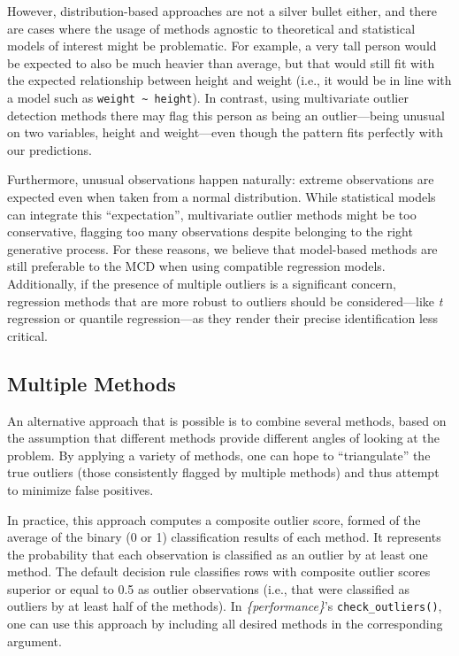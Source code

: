 \documentclass[mathematics,article,submit,moreauthors,pdftex]{mdpi}
\begin{document}
However, distribution-based approaches are not a silver bullet either,
and there are cases where the usage of methods agnostic to theoretical
and statistical models of interest might be problematic. For example, a
very tall person would be expected to also be much heavier than average,
but that would still fit with the expected relationship between height
and weight (i.e., it would be in line with a model such as
\texttt{weight\ \textasciitilde{}\ height}). In contrast, using
multivariate outlier detection methods there may flag this person as
being an outlier---being unusual on two variables, height and
weight---even though the pattern fits perfectly with our predictions.

Furthermore, unusual observations happen naturally: extreme observations
are expected even when taken from a normal distribution. While
statistical models can integrate this ``expectation'', multivariate
outlier methods might be too conservative, flagging too many
observations despite belonging to the right generative process. For
these reasons, we believe that model-based methods are still preferable
to the MCD when using compatible regression models. Additionally, if the
presence of multiple outliers is a significant concern, regression
methods that are more robust to outliers should be considered---like
\emph{t} regression or quantile regression---as they render their
precise identification less critical.

\hypertarget{multiple-methods}{%
\subsection{Multiple Methods}\label{multiple-methods}}

An alternative approach that is possible is to combine several methods,
based on the assumption that different methods provide different angles
of looking at the problem. By applying a variety of methods, one can
hope to ``triangulate'' the true outliers (those consistently flagged by
multiple methods) and thus attempt to minimize false positives.

In practice, this approach computes a composite outlier score, formed of
the average of the binary (0 or 1) classification results of each
method. It represents the probability that each observation is
classified as an outlier by at least one method. The default decision
rule classifies rows with composite outlier scores superior or equal to
0.5 as outlier observations (i.e., that were classified as outliers by
at least half of the methods). In \emph{\{performance\}}'s
\texttt{check\_outliers()}, one can use this approach by including all
desired methods in the corresponding argument.
\end{document}
